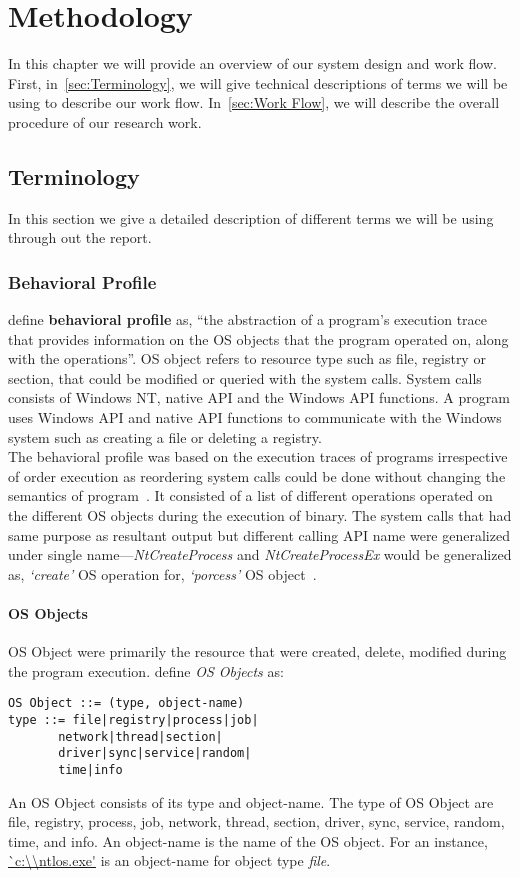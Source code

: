 \chapter{Methodology}\label{chapter:methodology}
In this chapter we will provide an overview of our system design and work flow.
First, in~\autoref{sec:Terminology}, we will give technical descriptions of terms we will be using to describe our work flow.
In~\autoref{sec:Work Flow}, we will describe the overall procedure of our research work.
\section{Terminology}
\label{sec:Terminology}
In this section we give a detailed description of different terms we will be using through out the report.
\subsection{Behavioral Profile}
\label{sub:Behavioral Profile}
\citeauthor{bayer} define \textbf{behavioral profile} as, ``the abstraction of a program's execution trace that provides information on the OS objects that the program operated on, along with the operations''.
OS object refers to resource type such as file, registry or section, that could be modified or queried with the system calls.
System calls consists of Windows NT, native API and the Windows API functions.
A program uses Windows API and native API functions to communicate with the Windows system such as creating a file or deleting a registry.\\

The behavioral profile was based on the execution traces of programs irrespective of order execution as reordering system calls could be done without changing the semantics of program~\cite[]{bayer}.
It consisted of a list of different operations operated on the different OS objects during the execution of binary.
The system calls that had same purpose as resultant output but different calling API name were generalized under single name---\emph{NtCreateProcess} and \emph{NtCreateProcessEx} would be generalized as, \emph{`create'} OS operation for, \emph{`porcess'} OS object~\cite[]{bayer}.\\
\subsubsection{OS Objects}
\label{ssub:OS Objects}
OS Object were primarily the resource that were created, delete, modified during the program execution.
\citeauthor{bayer} define \emph{OS Objects} as:
\begin{lstlisting}[numbers=none]
OS Object ::= (type, object-name)
type ::= file|registry|process|job|
       network|thread|section|
       driver|sync|service|random|
       time|info
\end{lstlisting}
An OS Object consists of its type and object-name.
The type of OS Object are file, registry, process, job, network, thread, section, driver, sync, service, random, time, and info.
An object-name is the name of the OS object.
For an instance, \url{`c:\\ntlos.exe'} is an object-name for object type \emph{file}.

